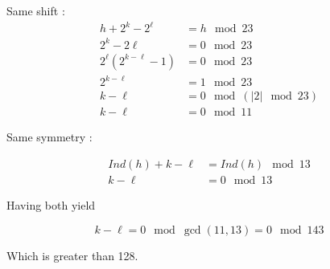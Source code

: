 \documentclass{article}
\begin{document}
Same shift : 
\begin{align*}
	h + 2^k - 2^\ell &= h \mod 23 \\
	2^k - 2\ell &= 0 \mod 23\\
	2^\ell( 2^{k-\ell} - 1) &= 0 \mod 23\\
 	2^{k-\ell} &= 1 \mod 23\\
	k - \ell &= 0 \mod (|2| \mod 23)\\
	k - \ell &= 0 \mod 11
\end{align*}

Same symmetry :

\begin{align*}
	Ind(h) + k - \ell &= Ind(h) \mod 13 \\
	k - \ell &= 0 \mod 13
\end{align*}	

Having both yield

$$k - \ell = 0 \mod \gcd(11,13) = 0 \mod 143$$

Which is greater than 128.

\end{document}
